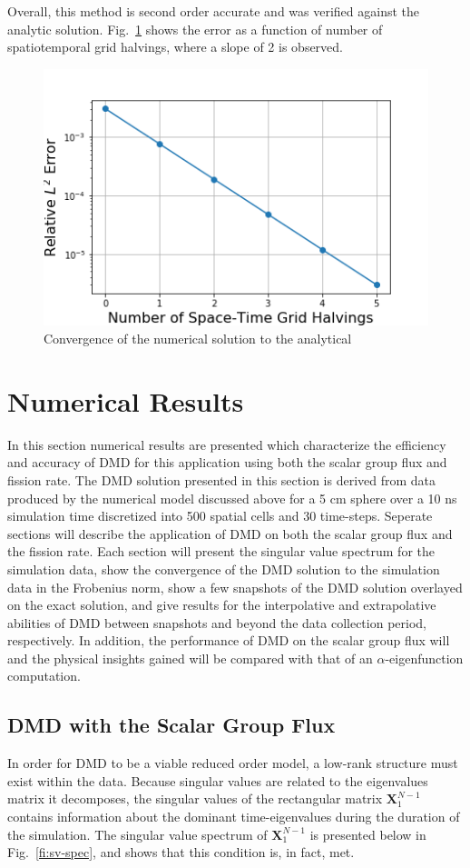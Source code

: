 \documentclass[12pt]{article}
\newcommand{\LFI}[1]{\label{fi:#1}}
\newcommand{\FI}[1]{Fig.~\ref{fi:#1}}
\newcommand{\bfg}{\begin{figure}}
\newcommand{\efg}{\end{figure}}
\begin{document}
Overall, this method is second order accurate and was verified against the 
	analytic solution. 
\FI{2ord} shows the error as a function of number of spatiotemporal grid 
	halvings, where a slope of 2 is observed.

\bfg[h] \centering
	\includegraphics[scale=0.5]{method_convergence.png}
	\caption{Convergence of the numerical solution to the analytical}
	\LFI{2ord}
\efg

\section{Numerical Results}
In this section numerical results are presented which characterize the 
	efficiency and accuracy of DMD for this application using both the scalar 
	group flux and fission rate.
The DMD solution presented in this section is derived from data produced by the 
	numerical model discussed above for a 5 cm sphere over a 10 ns simulation 
	time discretized into 500 spatial cells and 30 time-steps.
Seperate sections will describe the application of DMD on both the scalar 
	group flux and the fission rate.
Each section will present the singular value spectrum for the simulation data,
	show the convergence of the DMD solution to the simulation data in the 
	Frobenius norm, show a few snapshots of the DMD solution overlayed on the 
	exact solution, and give results for the interpolative and extrapolative 
	abilities of DMD between snapshots and beyond the data collection period, 
	respectively.
In addition, the performance of DMD on the scalar group flux will and the 
	physical insights gained will be compared with that of an 
	$\alpha$-eigenfunction computation.

\subsection{DMD with the Scalar Group Flux}
In order for DMD to be a viable reduced order model, a low-rank structure must 
	exist within the data.
Because singular values are related to the eigenvalues matrix it decomposes, 
	the singular values of the rectangular matrix $\bm{X}^{N-1}_1$ contains 
	information about the dominant time-eigenvalues during the duration of the 
	simulation.
The singular value spectrum of  $\bm{X}^{N-1}_1$ is presented below in 
	\FI{sv-spec}, and shows that this condition is, in fact, met.
\end{document}
